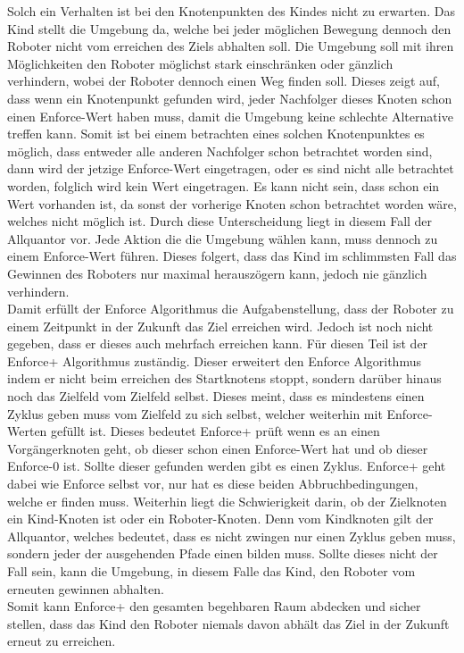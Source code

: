 Solch ein Verhalten ist bei den Knotenpunkten des Kindes nicht zu erwarten. Das Kind stellt die Umgebung da, welche bei jeder möglichen Bewegung dennoch den Roboter nicht vom erreichen des Ziels abhalten soll. Die Umgebung soll mit ihren Möglichkeiten den Roboter möglichst stark einschränken oder gänzlich verhindern, wobei der Roboter dennoch einen Weg finden soll. Dieses zeigt auf, dass wenn ein Knotenpunkt gefunden wird, jeder Nachfolger dieses Knoten schon einen Enforce-Wert haben muss, damit die Umgebung keine schlechte Alternative treffen kann. Somit ist bei einem betrachten eines solchen Knotenpunktes es möglich, dass entweder alle anderen Nachfolger schon betrachtet worden sind, dann wird der jetzige Enforce-Wert eingetragen, oder es sind nicht alle betrachtet worden, folglich wird kein Wert eingetragen. Es kann nicht sein, dass schon ein Wert vorhanden ist, da sonst der vorherige Knoten schon betrachtet worden wäre, welches nicht möglich ist. Durch diese Unterscheidung liegt in diesem Fall der Allquantor vor. Jede Aktion die die Umgebung wählen kann, muss dennoch zu einem Enforce-Wert führen. Dieses folgert, dass das Kind im schlimmsten Fall das Gewinnen des Roboters nur maximal herauszögern kann, jedoch nie gänzlich verhindern. \\
Damit erfüllt der Enforce Algorithmus die Aufgabenstellung, dass der Roboter zu einem Zeitpunkt in der Zukunft das Ziel erreichen wird. Jedoch ist noch nicht gegeben, dass er dieses auch mehrfach erreichen kann. Für diesen Teil ist der Enforce+ Algorithmus zuständig. Dieser erweitert den Enforce Algorithmus indem er nicht beim erreichen des Startknotens stoppt, sondern darüber hinaus noch das Zielfeld vom Zielfeld selbst. Dieses meint, dass es mindestens einen Zyklus geben muss vom Zielfeld zu sich selbst, welcher weiterhin mit Enforce-Werten gefüllt ist. Dieses bedeutet Enforce+ prüft wenn es an einen Vorgängerknoten geht, ob dieser schon einen Enforce-Wert hat und ob dieser Enforce-0 ist. Sollte dieser gefunden werden gibt es einen Zyklus. Enforce+ geht dabei wie Enforce selbst vor, nur hat es diese beiden Abbruchbedingungen, welche er finden muss. Weiterhin liegt die Schwierigkeit darin, ob der Zielknoten ein Kind-Knoten ist oder ein Roboter-Knoten. Denn vom Kindknoten gilt der Allquantor, welches bedeutet, dass es nicht zwingen nur einen Zyklus geben muss, sondern jeder der ausgehenden Pfade einen bilden muss. Sollte dieses nicht der Fall sein, kann die Umgebung, in diesem Falle das Kind, den Roboter vom erneuten gewinnen abhalten. \\
Somit kann Enforce+ den gesamten begehbaren Raum abdecken und sicher stellen, dass das Kind den Roboter niemals davon abhält das Ziel in der Zukunft erneut zu erreichen. \\
